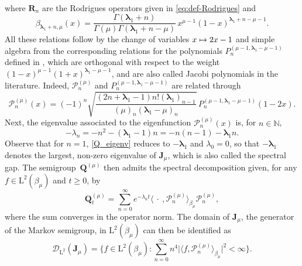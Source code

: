 \documentclass[10pt]{amsart}
\newcommand\mto{\mathchoice{\longmapsto}{\mapsto}{\mapsto}{\mapsto}}
\theoremstyle{plain}
\theoremstyle{definition}
\newcommand{\N}{\mathbb{N}}
\renewcommand{\P}{\mathcal{P}}
\newcommand{\calD}{\mathcal{D}}
\newcommand{\Rc}{\mathbf{R}}
\newcommand{\Leb}{\mathrm{L}}
\newcommand{\calJd}{\mathbf{J}}
\newcommand{\lam}{{\bm{\lambda}_1}}
\newcommand{\Q}[1][\mo]{\mathbf{Q}^{({#1})}}
\newcommand{\gab}[1][\lam,\mo]{{\beta_{#1}}}
\let\mo\mu
\begin{document}
\begin{appendix}
\begin{align}
\end{align}
where $\Rc_n$ are the Rodrigues operators given in \eqref{eq:def-Rodrigues} and
\begin{equation*}
\gab[\lam+n,\mu](x) = \frac{\Gamma(\lam+n)}{\Gamma(\mu)\Gamma(\lam+n-\mu)}\, x^{\mu-1}(1-x)^{\lam+n-\mu-1}.
\end{equation*}
All these relations follow by the change of variables $x \mto 2x-1$ and simple algebra from the corresponding relations for the polynomials $P_n^{(\mo-1,\lam-\mo-1)}$ defined in \cite[Chap.\,4]{Ismail}, which are orthogonal with respect to the weight $(1-x)^{\mo-1}(1+x)^{\lam-\mo-1}$, and are also called Jacobi polynomials in the literature. Indeed, $\P_n^{(\mo)}$ and $P_n^{(\mo-1,\lam-\mo-1)}$ are related through
\begin{equation*}
\P_n^{(\mo)}(x) = (-1)^n \sqrt{\frac{(2n+\lam-1)n!(\lam)_{n-1}}{(\mo)_n(\lam-\mo)_n}}\, P_n^{(\mo-1,\lam-\mo-1)}(1-2x).
\end{equation*}
Next, the eigenvalue associated to the eigenfunction $\P_n^{(\mo)}(x)$ is, for $n \in \N$,
\begin{equation}
\label{Q_eigenv}
-\lambda_n = -n^2-(\lam-1)n= -n(n-1)-\lam n.
\end{equation}
Observe that for $n=1$, \eqref{Q_eigenv} reduces to $-\lam$ and $\lambda_0=0$, so that $-\lam$ denotes the largest, non-zero eigenvalue of $\calJd_\mo$, which is also called the spectral gap. The semigroup~$\Q$ then admits the spectral decomposition given, for any $f \in \Leb^2(\gab[\mo])$ and $t \geq 0$, by
\begin{equation}
\label{Q_sem}
\Q_t = \sum_{n=0}^{\infty} e^{- \lambda_n t} \langle \: \cdot \:, \P^{(\mo)}_n \rangle_{\gab[\mo]} \P^{(\mo)}_n ,
\end{equation}
where the sum converges in the operator norm. The domain of $\calJd_\mo$, the generator of the Markov semigroup, in $\Leb^2(\gab[\mo])$ can then be identified as
\begin{equation*}
\calD_{\Leb^2}(\calJd_\mo) = \bigl\lbrace f \in \Leb^2(\gab[\mo]) : \textstyle\sum_{n=0}^\infty n^4 \bigl|\langle f, \P^{(\mo)}_n \rangle_{\gab[\mo]}\bigr|^2 < \infty \bigr\rbrace.
\end{equation*}

 \label{subsec:variance-decay}


\end{appendix}
\end{document}
